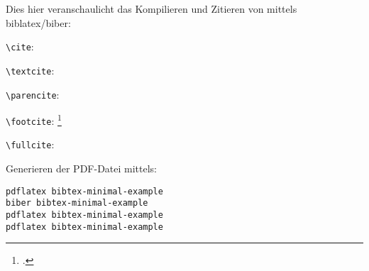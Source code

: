 \documentclass[12pt,a4paper,parskip=half]{scrartcl}
\begin{document}
Dies hier veranschaulicht das Kompilieren und Zitieren von
\cite{Voit2012b} mittels biblatex/biber:

\verb+\cite+: \cite{Voit2012b}

\verb+\textcite+: \textcite{Voit2012b}

\verb+\parencite+: \parencite{Voit2012b}

\verb+\footcite+: \footcite{Voit2012b}

\verb+\fullcite+: 

Generieren der PDF-Datei mittels:
\begin{verbatim}
pdflatex bibtex-minimal-example
biber bibtex-minimal-example
pdflatex bibtex-minimal-example
pdflatex bibtex-minimal-example
\end{verbatim}

\printbibliography
\end{document}
